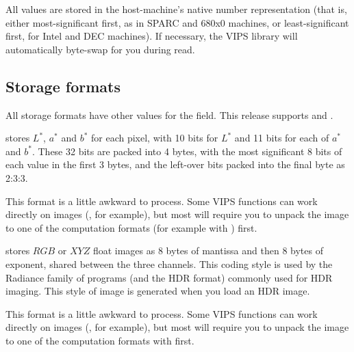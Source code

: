 All values are stored in the host-machine's native number representation (that
is, either most-significant first, as in SPARC and 680x0 machines, or
least-significant first, for Intel and DEC machines). If necessary, the VIPS 
library will automatically byte-swap for you during read.

\subsection{Storage formats}

All storage formats have other values for the  field. This
release supports  and .

 stores $L^{*}$, $a^{*}$ and $b^{*}$ for each pixel,
with 10 bits for $L^{*}$ and 11 bits for each of $a^{*}$ and $b^{*}$. These
32 bits are packed into 4 bytes, with the most significant 8 bits of each
value in the first 3 bytes, and the left-over bits packed into the final
byte as 2:3:3.

This format is a little awkward to process. Some VIPS functions can work
directly on  images (, for
example), but most will require you to unpack the image to one of the
computation formats (for example with ) first.

 stores $RGB$ or $XYZ$ float images as 8 bytes of mantissa
and then 8 bytes of exponent, shared between the three channels. This coding
style is used by the Radiance family of programs (and the HDR format) commonly
used for HDR imaging. This style of image is generated when you load an HDR
image.

This format is a little awkward to process. Some VIPS functions can work
directly on  images (, for
example), but most will require you to unpack the image to one of the
computation formats with  first.

